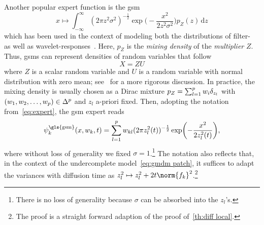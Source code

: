 Another popular expert function is the \gls{gsm}
\begin{equation}
	x \mapsto \int_{-\infty}^{\infty} (\num{2}\pi z^{\num{2}}\sigma^{\num{2}})^{-\frac{1}{2}} \exp\biggl( -\frac{x^{\num{2}}}{\num{2}z^{\num{2}}\sigma^{\num{2}}} \biggr) p_Z(z)\, \mathrm{d}z
\end{equation}
which has been used in the context of modeling both the distributions of filter-~\cite{qi_gao_generative_2012,schmidt_generative_2010} as well as wavelet-responses~\cite{portilla_image_2003,wainwright_scale_1999}.
Here, \( p_Z \) is the \emph{mixing density} of the \emph{multiplier} \( Z \).
Thus, \glspl{gsm} can represent densities of random variables that follow
\begin{equation}
	X = ZU
\end{equation}
where \( Z \) is a scalar random variable and \( U \) is a random variable with normal distribution with zero mean; see~\cite{andrews_scale_1974} for a more rigorous discussion.
In practice, the mixing density is usually chosen as a Dirac mixture \( p_Z = \sum_{l=\num{1}}^p w_i \delta_{z_l} \) with \( (w_{\num{1}}, w_{\num{2}}, \dotsc, w_p) \in \Delta^p \) and \( z_l \) a-priori fixed.
Then, adopting the notation from~\cref{eq:expert}, the \gls{gsm} expert reads
\begin{equation}
	\Expert_k^{\text{\gls{gsm}}}(x, w_k, t) = \sum_{l=\num{1}}^\NumComponents w_{kl} (\num{2}\pi z_l^{\num{2}}(t))^{-\frac{1}{2}} \exp\biggl( -\frac{x^{\num{2}}}{\num{2}z_l^{\num{2}}(t)} \biggr),
\end{equation}
where without loss of generality we fixed \( \sigma = \num{1} \).\footnote{%
	There is no loss of generality because \( \sigma \) can be absorbed into the \( z_l \)'s.%
}
The notation also reflects that, in the context of the undercomplete model~\cref{eq:gmdm patch}, it suffices to adapt the variances with diffusion time as \( z_l^{\num{2}} \mapsto z_l^{\num{2}} + \num{2}t\norm{\Filter_k}^{\num{2}} \).\footnote{%
	The proof is a straight forward adaption of the proof of~\cref{th:diff local}.
}


